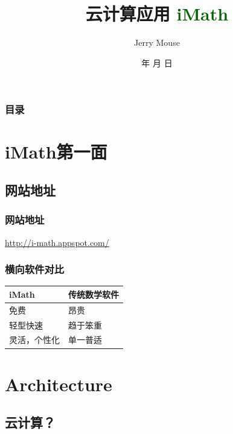 \documentclass[dvipdfm,serif,mathserif]{beamer}
\renewcommand{\today}{\number\year 年 \number\month 月 \number\day 日}
\begin{document}
\title{  云计算应用   \textcolor{darkgreen}{\textbf{iMath}}}
\date{\today}
\author{Jerry Mouse}

\begin{frame}
\framesubtitle{}
  \titlepage
\end{frame}

\begin{frame}\frametitle{目录}
\tableofcontents

\end{frame}



\section{iMath第一面}
\subsection{网站地址}
\begin{frame}
  \frametitle{网站地址}
\begin{LARGE}\href{http://i-math.appspot.com/}{\color{blue}http://i-math.appspot.com/}
\end{LARGE}\end{frame}

\begin{frame}
  \frametitle{横向软件对比}
\begin{center}

\begin{tabular}{m{}m{}}
\toprule
iMath & 传统数学软件 \\
\midrule
\rowcolor{lgray}
免费   & 昂贵 \\
轻型快速   & 趋于笨重   \\
\rowcolor{lgray}
灵活，个性化    & 单一普适   \\
\bottomrule
\end{tabular}

\end{center}
\end{frame}

\section{Architecture}
\subsection{云计算？}
\end{document}
